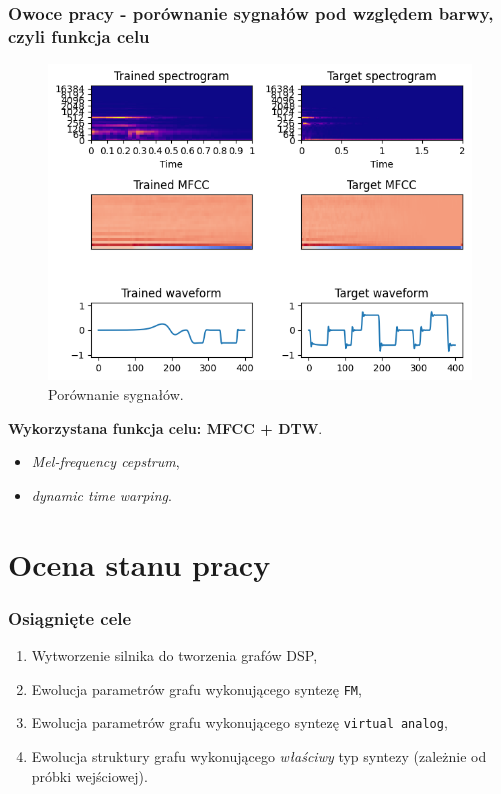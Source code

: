 \documentclass[]{beamer}
\begin{document}
\begin{frame}
  \frametitle{Owoce pracy - porównanie sygnałów pod względem barwy, czyli funkcja celu}

  \begin{multicols}{2}
  \begin{figure}
    \centering
    \includegraphics[width=1.0\linewidth]{example_signal_comparison.png}
    \caption{Porównanie sygnałów.}
  \end{figure}

    \textbf{Wykorzystana funkcja celu: MFCC + DTW}. \\
    \begin{itemize}
      \item \textit{Mel-frequency cepstrum},
      \item \textit{dynamic time warping}.
    \end{itemize}
  
  \end{multicols}
\end{frame}


\section{Ocena stanu pracy}

\begin{frame}
  \frametitle{Osiągnięte cele}

  \begin{enumerate}
    \item Wytworzenie silnika do tworzenia grafów DSP,
    \item Ewolucja parametrów grafu wykonującego syntezę \texttt{FM},
    \item Ewolucja parametrów grafu wykonującego syntezę \texttt{virtual analog},
    \item Ewolucja struktury grafu wykonującego \textit{właściwy} typ syntezy (zależnie od próbki wejściowej).
  \end{enumerate}
\end{frame}
\end{document}
